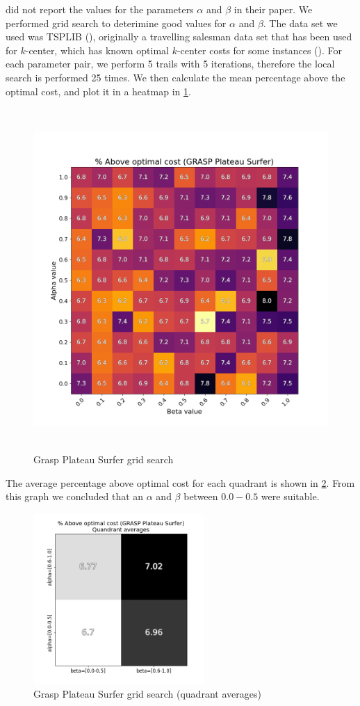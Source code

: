 \textcite{battiti_new_2017} did not report the values for the parameters $\alpha$ and $\beta$ in their paper. We performed grid search to deterimine good values for $\alpha$ and $\beta$. The data set we used was TSPLIB (\cite{reineltTSPLIBTravelingSalesman1991a}), originally a travelling salesman data set that has been used for $k$-center, which has known optimal $k$-center costs for some instances (\cite{pullan_memetic_2008}). For each parameter pair, we perform 5 trails with 5 iterations, therefore the local search is performed 25 times. We then calculate the mean percentage above the optimal cost, and plot it in a heatmap in \cref{fig:grid_search_heatmap}.

\begin{figure}[H]
    \centering
    \includegraphics[height=13cm]{images/grasp_heatmap.png}
    \caption{Grasp Plateau Surfer grid search}
    \label{fig:grid_search_heatmap}
\end{figure}

The average percentage above optimal cost for each quadrant is shown in \cref{fig:grid_search_quadrant}. From this graph we concluded that an $\alpha$ and $\beta$ between $0.0-0.5$ were suitable.

\begin{figure}[H]
    \centering
    \includegraphics[height=6.5cm]{images/quadrant_averages_grasp.png}
    \caption{Grasp Plateau Surfer grid search (quadrant averages)}
    \label{fig:grid_search_quadrant}
\end{figure}